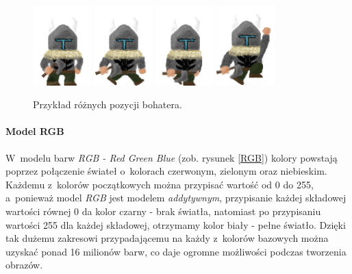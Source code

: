 \documentclass[12pt,a4paper,oneside]{book}
\theoremstyle{definition}
\numberwithin{equation}{chapter}
\begin{document}
\begin{figure}[hpt!]
        \centering
        \includegraphics[width=0.2\textwidth]{images/player_standR.png}
        \includegraphics[width=0.2\textwidth]{images/player_walkR1.png}
        \includegraphics[width=0.2\textwidth]{images/player_walkR2.png}
        \includegraphics[width=0.2\textwidth]{images/player_jumpR.png}
        \caption{Przykład różnych pozycji bohatera.}
        \label{HeroSkin}
\end{figure}
\newpage
\paragraph{Model RGB}\hfill \break
\par W~modelu barw \textit{RGB - Red Green Blue} (zob. rysunek \ref{RGB}) kolory powstają poprzez połączenie świateł o~kolorach czerwonym, zielonym oraz niebieskim. Każdemu z~kolorów początkowych można przypisać wartość od 0 do 255, a~ponieważ model \textit{RGB} jest modelem \textit{addytywnym}, przypisanie każdej składowej wartości równej 0 da kolor czarny - brak światła, natomiast po przypisaniu wartości 255 dla każdej składowej, otrzymamy kolor biały - pełne światło. Dzięki tak dużemu zakresowi przypadającemu na każdy z~kolorów bazowych można uzyskać ponad 16 milionów barw, co daje ogromne możliwości podczas tworzenia obrazów.
\end{document}
